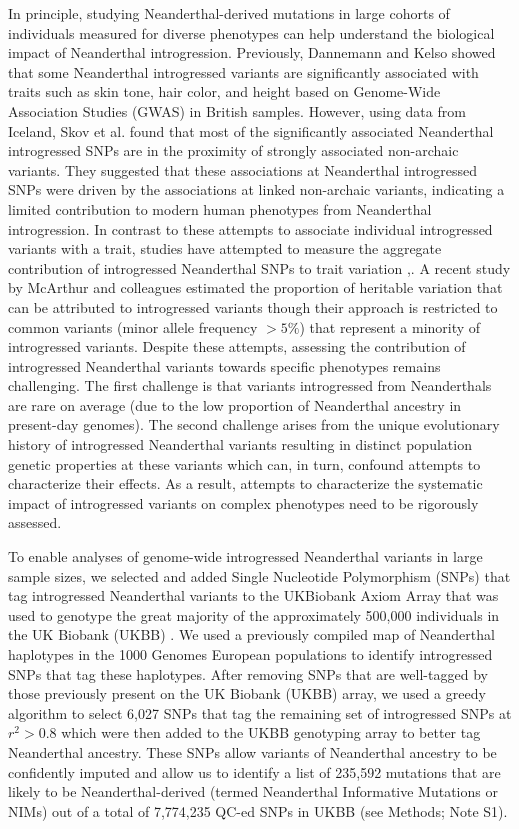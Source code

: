 In principle, studying Neanderthal-derived mutations in large cohorts of individuals measured for diverse phenotypes can help understand the biological impact of Neanderthal introgression. Previously, Dannemann and Kelso \cite{dannemann2017contribution} showed that some Neanderthal introgressed variants are significantly associated with traits such as skin tone, hair color, and height based on Genome-Wide Association Studies (GWAS) in British samples. However, using data from Iceland, Skov et al. \cite{skov2020nature} found that most of the significantly associated Neanderthal introgressed SNPs are in the proximity of strongly associated non-archaic variants. They suggested that these associations at Neanderthal introgressed SNPs were driven by the associations at linked non-archaic variants, indicating a limited contribution to modern human phenotypes from Neanderthal introgression. In contrast to these attempts to associate individual introgressed variants with a trait, studies have attempted to measure the aggregate contribution of introgressed Neanderthal SNPs to trait variation \cite{simonti2016phenotypic},\cite{mcarthur2021quantifying}. A recent study by McArthur and colleagues \cite{mcarthur2021quantifying} estimated the proportion of heritable variation that can be attributed to introgressed variants though their approach is restricted to common variants (minor allele frequency $> 5\%$)  that represent a minority of introgressed variants. Despite these attempts, assessing the contribution of introgressed Neanderthal variants towards specific phenotypes remains challenging. The first challenge is that variants introgressed from Neanderthals are rare on average (due to the low proportion of Neanderthal ancestry in present-day genomes). The second challenge arises from the unique evolutionary history of introgressed Neanderthal variants resulting in distinct population genetic properties at these variants which can, in turn, confound attempts to characterize their effects. As a result, attempts to characterize the systematic impact of introgressed variants on complex phenotypes need to be rigorously assessed.

To enable analyses of genome-wide introgressed Neanderthal variants in large sample sizes, we selected and added Single Nucleotide Polymorphism (SNPs) that tag introgressed Neanderthal variants to the UKBiobank Axiom Array that was used to genotype the great majority of the approximately 500,000 individuals in the UK Biobank (UKBB) \cite{bycroft2018uk}. We used a previously compiled map of Neanderthal haplotypes in the 1000 Genomes European populations \cite{sankararaman2014genomic} to identify introgressed SNPs that tag these haplotypes. After removing SNPs that are well-tagged by those previously present on the UK Biobank (UKBB) array, we used a greedy algorithm to select 6,027 SNPs that tag the remaining set of introgressed SNPs at $r^2>0.8$ which were then added to the UKBB genotyping array to better tag Neanderthal ancestry. These SNPs allow variants of Neanderthal ancestry to be confidently imputed and allow us to identify a list of 235,592 mutations that are likely to be Neanderthal-derived (termed Neanderthal Informative Mutations or NIMs) out of a total of  7,774,235 QC-ed SNPs in UKBB (see Methods; Note S1). 

